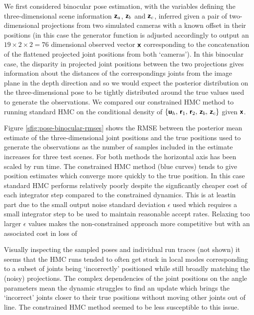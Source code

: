 We first considered binocular pose estimation, with the variables defining the three-dimensional scene information $\boldsymbol{\mathsf{z}}_a$, $\boldsymbol{\mathsf{z}}_b$ and $\boldsymbol{\mathsf{z}}_c$, inferred given a pair of two-dimensional projections from two simulated cameras with a known offset in their positions (in this case the generator function is adjusted accordingly to output an $19 \times 2 \times 2 = 76$ dimensional observed vector $\boldsymbol{\mathsf{x}}$ corresponding to the concatenation of the flattened projected joint positions from both `cameras'). In this binocular case, the disparity in projected joint positions between the two projections gives information about the distances of the correspondings joints from the image plane in the depth direction and so we would expect the posterior distribution on the three-dimensional pose to be tightly distributed around the true values used to generate the observations. We compared our constrained \ac{HMC} method to running standard \ac{HMC} on the conditional density of $\fset{\rvct{u}_h,\,\rvct{r}_1,\,\rvct{r}_2,\,\rvct{z}_b,\,\rvct{z}_c}$ given $\boldsymbol{\mathsf{x}}$.

Figure \ref{sfig:pose-binocular-rmses} shows the \ac{RMSE} between the posterior mean estimate of the three-dimensional joint positions and the true positions used to generate the observations as the number of samples included in the estimate increases for three test scenes. For both methods the horizontal axis has been scaled by run time. The constrained \ac{HMC} method (blue curves) tends to give position estimates which converge more quickly to the true position. In this case standard \ac{HMC} performs relatively poorly despite the signficantly cheaper cost of each integrator step compared to the constrained dynamics. This is at leastin part due to the small output noise standard deviation $\epsilon$ used which requires a small integrator step to be used to maintain reasonable accept rates. Relaxing too larger $\epsilon$ values makes the non-constrained approach more competitive but with an associated cost in loss of 

 Visually inspecting the sampled poses and individual run traces (not shown) it seems that the \ac{HMC} runs tended to often get stuck in local modes corresponding to a subset of joints being `incorrectly' positioned while still broadly matching the (noisy) projections. The complex dependencies of the joint positions on the angle parameters mean the dynamic struggles to find an update which brings the `incorrect' joints closer to their true positions without moving other joints out of line. The constrained \ac{HMC} method seemed to be less susceptible to this issue.

